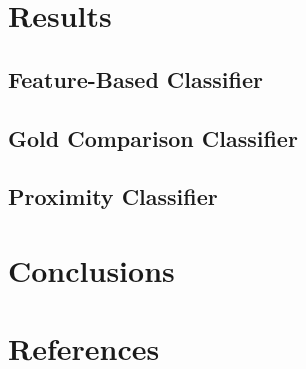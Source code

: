 \documentclass[preprint,5p,times,twocolumn]{elsarticle}
\begin{document}
\section{Results}
\label{results}
\lipsum[1-2]


\subsection{Feature-Based Classifier}
\label{results:featurebased}
\lipsum[1-2]

\subsection{Gold Comparison Classifier}
\label{results:gold}
\lipsum[1-1]

\subsection{Proximity Classifier}
\label{results:proximity}
\lipsum[1-3]

\section{Conclusions}
\label{conclusions}
\lipsum[1-3]

\section{References}
\label{references}













\end{document}

